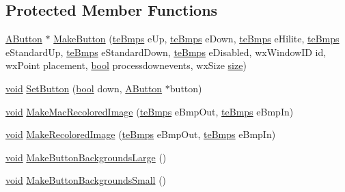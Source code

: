 \subsection*{Protected Member Functions}
\begin{DoxyCompactItemize}
\item 
\hyperlink{class_a_button}{A\+Button} $\ast$ \hyperlink{class_tool_bar_ae702584ee96adbbeba44e980abb2cc73}{Make\+Button} (\hyperlink{_theme_8h_a2beab2c3ca8cfcbb2cc0a1e27138dcf4}{te\+Bmps} e\+Up, \hyperlink{_theme_8h_a2beab2c3ca8cfcbb2cc0a1e27138dcf4}{te\+Bmps} e\+Down, \hyperlink{_theme_8h_a2beab2c3ca8cfcbb2cc0a1e27138dcf4}{te\+Bmps} e\+Hilite, \hyperlink{_theme_8h_a2beab2c3ca8cfcbb2cc0a1e27138dcf4}{te\+Bmps} e\+Standard\+Up, \hyperlink{_theme_8h_a2beab2c3ca8cfcbb2cc0a1e27138dcf4}{te\+Bmps} e\+Standard\+Down, \hyperlink{_theme_8h_a2beab2c3ca8cfcbb2cc0a1e27138dcf4}{te\+Bmps} e\+Disabled, wx\+Window\+ID id, wx\+Point placement, \hyperlink{mac_2config_2i386_2lib-src_2libsoxr_2soxr-config_8h_abb452686968e48b67397da5f97445f5b}{bool} processdownevents, wx\+Size \hyperlink{group__lavu__mem_ga854352f53b148adc24983a58a1866d66}{size})
\item 
\hyperlink{sound_8c_ae35f5844602719cf66324f4de2a658b3}{void} \hyperlink{class_tool_bar_a9bade48a9f76d1456a879a4920d32da5}{Set\+Button} (\hyperlink{mac_2config_2i386_2lib-src_2libsoxr_2soxr-config_8h_abb452686968e48b67397da5f97445f5b}{bool} down, \hyperlink{class_a_button}{A\+Button} $\ast$button)
\item 
\hyperlink{sound_8c_ae35f5844602719cf66324f4de2a658b3}{void} \hyperlink{class_tool_bar_a37bb89046d10dbdedfe050d324f894fd}{Make\+Mac\+Recolored\+Image} (\hyperlink{_theme_8h_a2beab2c3ca8cfcbb2cc0a1e27138dcf4}{te\+Bmps} e\+Bmp\+Out, \hyperlink{_theme_8h_a2beab2c3ca8cfcbb2cc0a1e27138dcf4}{te\+Bmps} e\+Bmp\+In)
\item 
\hyperlink{sound_8c_ae35f5844602719cf66324f4de2a658b3}{void} \hyperlink{class_tool_bar_aff40ca58d8b28e8a09a73a227db9bbfe}{Make\+Recolored\+Image} (\hyperlink{_theme_8h_a2beab2c3ca8cfcbb2cc0a1e27138dcf4}{te\+Bmps} e\+Bmp\+Out, \hyperlink{_theme_8h_a2beab2c3ca8cfcbb2cc0a1e27138dcf4}{te\+Bmps} e\+Bmp\+In)
\item 
\hyperlink{sound_8c_ae35f5844602719cf66324f4de2a658b3}{void} \hyperlink{class_tool_bar_a72f610dc79e0e2b93583b21e2f3d3c5d}{Make\+Button\+Backgrounds\+Large} ()
\item 
\hyperlink{sound_8c_ae35f5844602719cf66324f4de2a658b3}{void} \hyperlink{class_tool_bar_a9d6ca810cb5a713f405514bc1568c84b}{Make\+Button\+Backgrounds\+Small} ()

\end{DoxyCompactItemize}
